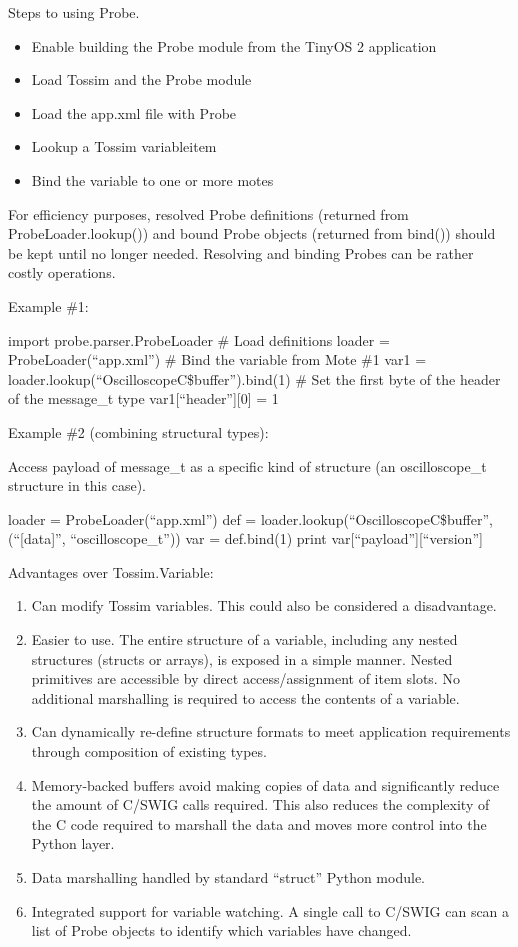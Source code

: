 Steps to using Probe.
\begin{itemize}
\item Enable building the Probe module from the TinyOS 2 application
\item Load Tossim and the Probe module
\item Load the app.xml file with Probe
\item Lookup a Tossim variableitem
\item Bind the variable to one or more motes
\end{itemize}

For efficiency purposes, resolved Probe definitions (returned from
ProbeLoader.lookup()) and bound Probe objects (returned from bind())
should be kept until no longer needed. Resolving and binding Probes
can be rather costly operations.

Example \#1:

import probe.parser.ProbeLoader
\# Load definitions
loader = ProbeLoader(``app.xml'')
\# Bind the variable from Mote \#1
var1 = loader.lookup(``OscilloscopeC\$buffer'').bind(1)
\# Set the first byte of the header of the message\_t type
var1[``header''][0] = 1

Example \#2 (combining structural types): 

Access payload of message\_t as a specific kind of structure (an
oscilloscope\_t structure in this case).

loader = ProbeLoader(``app.xml'')
def = loader.lookup(``OscilloscopeC\$buffer'',
                    (``[data]'', ``oscilloscope\_t''))
var = def.bind(1)
print var[``payload''][``version'']


Advantages over Tossim.Variable:

\begin{enumerate}
\item Can modify Tossim variables. This could also be considered a
  disadvantage.
\item Easier to use. The entire structure of a variable, including any
  nested structures (structs or arrays), is exposed in a simple
  manner. Nested primitives are accessible by direct access/assignment
  of item slots. No additional marshalling is required to access the
  contents of a variable.
\item Can dynamically re-define structure formats to meet application
  requirements through composition of existing types.
\item Memory-backed buffers avoid making copies of data and
  significantly reduce the amount of C/SWIG calls required. This also
  reduces the complexity of the C code required to marshall the data
  and moves more control into the Python layer.
\item Data marshalling handled by standard ``struct'' Python module.
\item Integrated support for variable watching. A single call to
  C/SWIG can scan a list of Probe objects to identify which
  variables have changed.
\end{enumerate}

